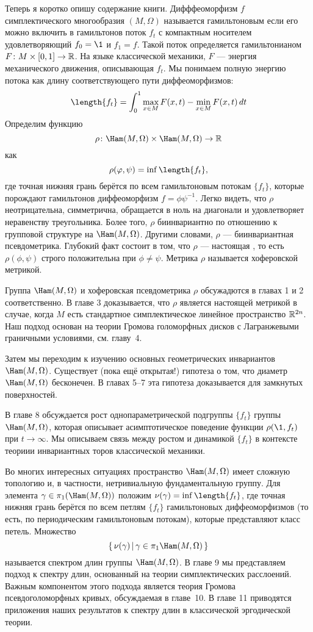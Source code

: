 Теперь я коротко опишу содержание книги.
Дифффеоморфизм $f$ симплектического многообразия $(M,\Omega)$
называется гамильтоновым если его можно включить в гамильтонов поток
$f_t$ с компактным носителем удовлетворяющий $f_0=\1$ и $f_1 =f$.
Такой поток определяется гамильтонианом $F\colon M \times [0, 1] \to \mathbb{R}$.
На языке классической механики, $F$ --- энергия механического движения, описывающая $f_t$.
Мы понимаем полную энергию потока как длину соответствующего пути диффеоморфизмов:
\[\length \{f_t\} =
\int_0^1\max_{x\in M}F(x,t)-\min_{x\in M}F(x,t)\, dt 
\]%
Определим функцию
\[\rho\: \Ham(M,\Omega) \times \Ham(M,\Omega) \to \RR\]
как
\[\rho (\phi, \psi) = \inf \length \{f_t\},\]
где точная нижняя грань берётся по всем гамильтоновым потокам $\{f_t\}$, которые
порождают гамильтонов диффеоморфизм $f = \phi\psi^{-1}$.
Легко видеть, что $\rho$ неотрицательна, симметрична, обращается в ноль на диагонали и удовлетворяет неравенству треугольника.
Более того, $\rho$ биинвариантно по отношению к групповой структуре на $\Ham(M,\Omega)$.
Другими словами, $\rho$ --- биинвариантная псевдометрика.
Глубокий факт состоит в том, что $\rho$ --- настоящая , то есть $\rho (\phi, \psi)$ строго положительна при $\phi \ne \psi$.
Метрика $\rho$ называется хоферовской метрикой.

Группа $\Ham(M,\Omega)$ и хоферовская псевдометрика $\rho$ обсужадются в главах 1 и 2 соответственно.
В главе 3 доказывается, что $\rho$ является настоящей метрикой в случае, когда $M$ есть стандартное симплектическое линейное пространство $\mathbb{R}^{2n}$.
Наш подход основан на теории Громова голоморфных дисков с Лагранжевыми граничными условиями, см.
главу~4.

Затем мы переходим к изучению основных геометрических инвариантов $\Ham(M,\Omega)$.
Существует (пока ещё открытая!) гипотеза о том, что диаметр $\Ham(M,\Omega)$ бесконечен.
В главах 5--7 эта гипотеза доказывается для замкнутых поверхностей.

В главе 8 обсуждается рост однопараметрической подгруппы $\{f_t\}$ группы $\Ham(M,\Omega)$, которая описывает асимптотическое поведение функции $\rho (\1, f_t)$ при $t \to \infty$.
Мы описываем связь между ростом и динамикой $\{f_t\}$ в контексте
теориии инвариантных торов классической механики.

Во многих интересных ситуациях пространство $\Ham(M,\Omega)$ имеет сложную топологию и, в частности, нетривиальную фундаментальную группу.
Для элемента $\gamma\in\pi_1(\Ham(M,\Omega))$ положим $\nu(\gamma) \z= \inf \length \{f_t\}$, где
точная нижняя грань берётся по всем петлям $\{f_t\}$ гамильтоновых
диффеоморфизмов (то есть, по периодическим гамильтоновым потокам),
которые представляют класс петель.
Множество
\[\set{\nu(\gamma)}{\gamma\in\pi_{1}\Ham(M,\Omega)}\]
называется спектром длин группы $\Ham(M,\Omega)$.
В главе 9 мы представляем подход к спектру длин, основанный на теории симплектических расслоений.
Важным компонентом этого подхода является теория Громова псевдоголоморфных кривых, обсуждаемая в главе~10.
В главе 11 приводятся приложения наших результатов к спектру длин в классической эргодической теории.

